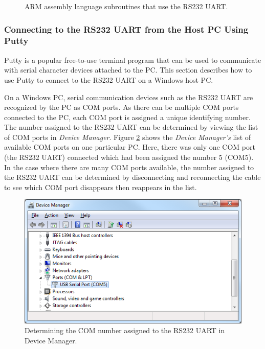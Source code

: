 \documentclass[11pt, twoside, pdftex]{article}
\begin{document}
\begin{figure}[h!]

\caption{ARM assembly language subroutines that use the RS232
UART.}
   \label{fig:rs232_uart_arm}
\end{figure}
\pagebreak
\clearpage
\newpage

\subsubsection{Connecting to the RS232 UART from the Host PC Using Putty}
\label{sec:putty_uart}

Putty is a popular free-to-use terminal program that can be used to communicate with serial character devices attached to the PC. This section describes how to use Putty to connect to the RS232 UART on a Windows host PC. 

On a Windows PC, serial communication devices such as the RS232 UART are recognized by the PC as COM ports. As there can be multiple COM ports connected to the PC, each COM port is assigned a unique identifying number. The number assigned to the RS232 UART can be determined by viewing the list of COM ports in \textit{Device Manager}. Figure \ref{fig:putty_0} shows the \textit{Device Manager's} list of available COM ports on one particular PC. Here, there was only one COM port (the RS232 UART) connected which had been assigned the number 5 (COM5). In the case where there are many COM ports available, the number assigned to the RS232 UART can be determined by disconnecting and reconnecting the cable to see which COM port disappears then reappears in the list.

\begin{figure}[h!]
   \begin{center}
       \includegraphics[scale=0.7]{figures/fig_putty_tut_0}
   \end{center}
   \caption{Determining the COM number assigned to the RS232 UART in Device Manager.}
	\label{fig:putty_0}
\end{figure}
\end{document}
